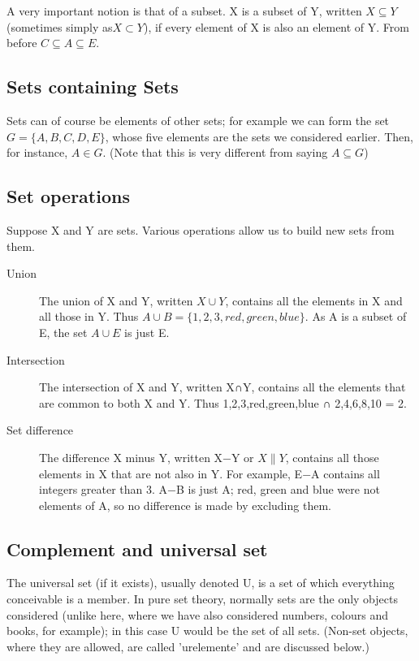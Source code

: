 \documentclass[12pt]{article}
\begin{document}
A very important notion is that of a subset. X is a subset of Y, written $X \subseteq Y$ (sometimes simply as$X \subset Y$), if every element of X is also an element of Y. From before $C\subseteq A \subseteq E$.
\subsection{Sets containing Sets}


Sets can of course be elements of other sets; for example we can form the set $G = \{A,B,C,D,E\}$, whose five elements are the sets we considered earlier. Then, for instance, $A\in G$. (Note that this is very different from saying $A\subseteq G$)


\subsection{Set operations}

Suppose X and Y are sets. Various operations allow us to build new sets from them.

\begin{description}
\item[Union]
The union of X and Y, written $X\cup Y$, contains all the elements in X and all those in Y. Thus $A \cup B = \{1, 2, 3, red, green, blue\}$. As A is a subset of E, the set $A \cup E$ is just E.

\item[Intersection]

The intersection of X and Y, written X∩Y, contains all the elements that are common to both X and Y. Thus {1,2,3,red,green,blue} ∩ {2,4,6,8,10} = {2}.

\item[Set difference]

The difference X minus Y, written X−Y or $X\|Y$, contains all those elements in X that are not also in Y. For example, E−A contains all integers greater than 3. A−B is just A; red, green and blue were not elements of A, so no difference is made by excluding them.
\end{description}
\newpage
\subsection{Complement and universal set}

The universal set (if it exists), usually denoted U, is a set of which everything conceivable is a member. In pure set theory, normally sets are the only objects considered (unlike here, where we have also considered numbers, colours and books, for example); in this case U would be the set of all sets. (Non-set objects, where they are allowed, are called 'urelemente' and are discussed below.)
\end{document}
